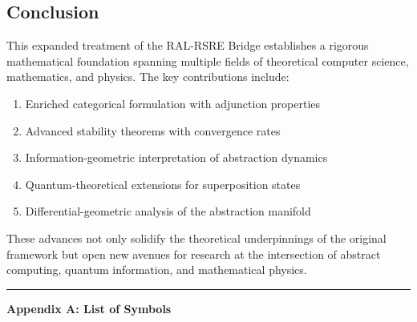 \documentclass[
]{article}
\providecommand{\tightlist}{%
  \setlength{\itemsep}{0pt}\setlength{\parskip}{0pt}}
\begin{document}
\subsection{Conclusion}\label{conclusion-2}

This expanded treatment of the RAL-RSRE Bridge establishes a rigorous
mathematical foundation spanning multiple fields of theoretical computer
science, mathematics, and physics. The key contributions include:

\begin{enumerate}
\def\labelenumi{\arabic{enumi}.}
\tightlist
\item
  Enriched categorical formulation with adjunction properties
\item
  Advanced stability theorems with convergence rates
\item
  Information-geometric interpretation of abstraction dynamics
\item
  Quantum-theoretical extensions for superposition states
\item
  Differential-geometric analysis of the abstraction manifold
\end{enumerate}

These advances not only solidify the theoretical underpinnings of the
original framework but open new avenues for research at the intersection
of abstract computing, quantum information, and mathematical physics.

\begin{center}\rule{0.5\linewidth}{0.5pt}\end{center}

\textbf{Appendix A: List of Symbols}
\end{document}
